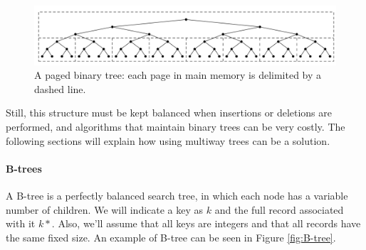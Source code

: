 \begin{figure}[h!]
    \centering
    \includegraphics[width=1.0\linewidth]{img/paged_bintree.png}
    \caption{A paged binary tree: each page in main memory is delimited by a dashed line.}
    \label{fig:paged-bintree}
\end{figure}

Still, this structure must be kept balanced when insertions or deletions are performed, and algorithms that maintain binary trees can be very costly. The following sections will explain how using multiway trees can be a solution.

\paragraph{B-trees}

A B-tree is a perfectly balanced search tree, in which each node has a variable number of children. We will indicate a key as $k$ and the full record associated with it $k*$. Also, we'll assume that all keys are integers and that all records have the same fixed size. An example of B-tree can be seen in Figure \ref{fig:B-tree}.

